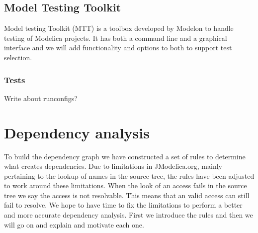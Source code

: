 \documentclass{cslthse-msc}
\begin{document}

\section{Model Testing Toolkit}
Model testing Toolkit (MTT) is a toolbox developed by Modelon to handle testing of Modelica projects. \cite{modelon.comMTT}It has both a command line and a graphical interface and we will add functionality and options to both to support test selection.

\subsection{Tests}
    Write about runconfigs?

\chapter[Dependency analysis]{Dependency analysis}
To build the dependency graph we have constructed a set of rules to determine what creates dependencies. Due to limitations in JModelica.org, mainly pertaining to the lookup of names in the source tree, the rules have been adjusted to work around these limitations. When the look of an access fails in the source tree we say the access is not resolvable. This means that an valid access can still fail to resolve. We hope to have time to fix the limitations to perform a better and more accurate dependency analysis. First we introduce the rules and then we will go on and explain and motivate each one.
\end{document}
